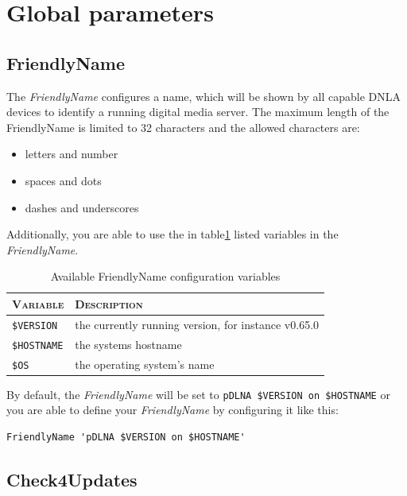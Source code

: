 \documentclass[a4paper,oneside,10pt]{report}
\newenvironment{colframefile}{%
  \begin{Sbox}
    \begin{minipage}{.99\columnwidth}
}{%
  \end{minipage}
  \end{Sbox}
  \begin{center}
    \fcolorbox{black}{Yellow}{\TheSbox}
  \end{center}
}
\newcommand{\pDLNAversion}{0.65.0}
\begin{document}
\section{Global parameters}

\subsection{FriendlyName}

The {\em FriendlyName} configures a name, which will be shown by all capable DNLA devices to identify a running digital media server. The maximum length of the {FriendlyName} is limited to 32 characters and the allowed characters are:
\begin{itemize}
	\item letters and number
	\item spaces and dots
	\item dashes and underscores
\end{itemize}

Additionally, you are able to use the in table\ref{tab:AvailableFriendlyNameVariables} listed variables in the {\em FriendlyName}.

\begin{table}
	\centering
	\begin{tabular}{|p{7em}|p{25em}|}
		\hline
		\textsc{Variable} 	& \textsc{Description}\\
		\hline
		\hline
		\verb|$VERSION| 		& the currently running version, for instance v\pDLNAversion \\
		\hline
		\verb|$HOSTNAME| 		& the systems hostname \\
		\hline
		\verb|$OS| 					& the operating system's name \\
		\hline
	\end{tabular}
	\caption{Available FriendlyName configuration variables}
	\label{tab:AvailableFriendlyNameVariables}
\end{table}

By default, the {\em FriendlyName} will be set to \verb|pDLNA $VERSION on $HOSTNAME| or you are able to define your {\em FriendlyName} by configuring it like this:

\begin{colframefile}
\begin{verbatim}
FriendlyName 'pDLNA $VERSION on $HOSTNAME'
\end{verbatim}
\end{colframefile}

\subsection{Check4Updates}
\label{config-check4updates}
\end{document}
